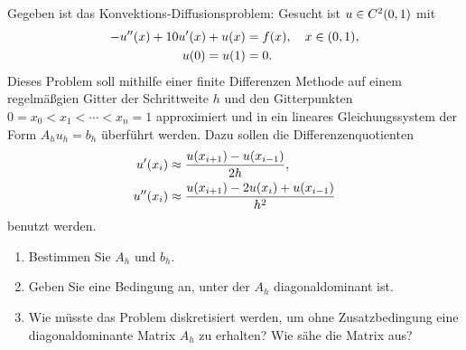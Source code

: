 \documentclass{exercise}
\begin{document}
    \begin{problem}
        Gegeben ist das Konvektions-Diffusionsproblem: Gesucht ist \(u \in C^2\parentheses*{0, 1}\) mit
        \begin{align*}
            -u''\parentheses*{x} + 10u'\parentheses*{x} + u\parentheses*{x} &= f\parentheses*{x}, \quad x \in \parentheses*{0, 1},\\
            u\parentheses*{0} = u\parentheses*{1} &= 0.
        \end{align*}
        Dieses Problem soll mithilfe einer finite Differenzen Methode auf einem regelmäßgien Gitter der Schrittweite \(h\) und den Gitterpunkten \(0 = x_0 < x_1 < \cdots < x_n = 1\) approximiert und in ein lineares Gleichungssystem der Form \(A_h u_h = b_h\) überführt werden.
        Dazu sollen die Differenzenquotienten
        \begin{align*}
            u'\parentheses*{x_i} &\approx \frac{u\parentheses*{x_{i + 1}} - u\parentheses*{x_{i - 1}}}{2h},\\
            u''\parentheses*{x_i} &\approx \frac{u\parentheses*{x_{i + 1}} - 2u\parentheses*{x_i} + u\parentheses*{x_{i - 1}}}{h^2}
        \end{align*}
        benutzt werden.
        \begin{enumerate}
            \item Bestimmen Sie \(A_h\) und \(b_h\).
            \item Geben Sie eine Bedingung an, unter der \(A_h\) diagonaldominant ist.
            \item Wie müsste das Problem diskretisiert werden, um ohne Zusatzbedingung eine diagonaldominante Matrix \(A_h\) zu erhalten?
            Wie sähe die Matrix aus?
        \end{enumerate}
    \end{problem}
    
\end{document}
